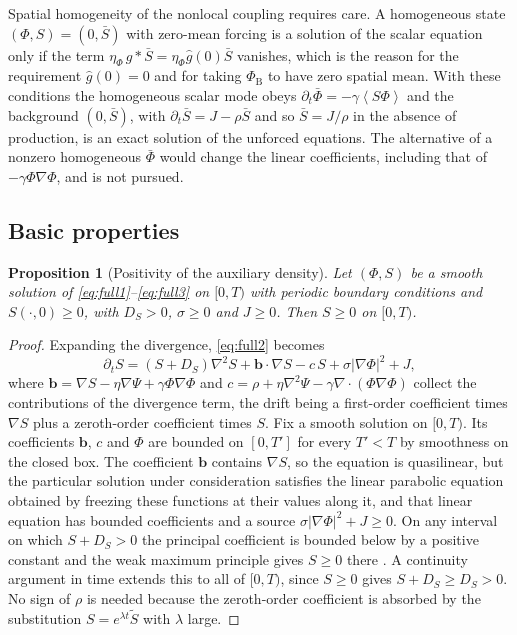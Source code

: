 \documentclass[11pt]{article}
\newtheorem{proposition}{Proposition}[section]
\theoremstyle{definition}
\theoremstyle{remark}
\newcommand{\Phib}{{\Phi_{\mathrm{B}}}}
\newcommand{\Sb}{\bar{S}}
\newcommand{\avg}[1]{\left\langle #1 \right\rangle}
\begin{document}
Spatial homogeneity of the nonlocal coupling requires care. A homogeneous state $(\Phi,S)=(0,\Sb)$ with zero-mean forcing is a solution of the scalar equation only if the term $\eta_\Phi\,g*\Sb=\eta_\Phi\hat g(0)\Sb$ vanishes, which is the reason for the requirement $\hat g(0)=0$ and for taking $\Phib$ to have zero spatial mean. With these conditions the homogeneous scalar mode obeys $\partial_t\bar\Phi=-\gamma\avg{S\Phi}$ and the background $(0,\Sb)$, with $\partial_t\Sb=J-\rho\Sb$ and so $\Sb=J/\rho$ in the absence of production, is an exact solution of the unforced equations. The alternative of a nonzero homogeneous $\bar\Phi$ would change the linear coefficients, including that of $-\gamma\Phi\nabla\Phi$, and is not pursued.

\subsection{Basic properties}

\begin{proposition}[Positivity of the auxiliary density]\label{prop:pos}
Let $(\Phi,S)$ be a smooth solution of \eqref{eq:full1}--\eqref{eq:full3} on $[0,T)$ with periodic boundary conditions and $S(\cdot,0)\ge0$, with $D_S>0$, $\sigma\ge0$ and $J\ge0$. Then $S\ge0$ on $[0,T)$.
\end{proposition}

\begin{proof}
Expanding the divergence, \eqref{eq:full2} becomes
\begin{equation}
\partial_tS=(S+D_S)\nabla^2S+\mathbf b\cdot\nabla S-c\,S+\sigma|\nabla\Phi|^2+J,
\end{equation}
where $\mathbf b=\nabla S-\eta\nabla\Psi+\gamma\Phi\nabla\Phi$ and $c=\rho+\eta\nabla^2\Psi-\gamma\nabla\!\cdot\!(\Phi\nabla\Phi)$ collect the contributions of the divergence term, the drift being a first-order coefficient times $\nabla S$ plus a zeroth-order coefficient times $S$. Fix a smooth solution on $[0,T)$. Its coefficients $\mathbf b$, $c$ and $\Phi$ are bounded on $[0,T']$ for every $T'<T$ by smoothness on the closed box. The coefficient $\mathbf b$ contains $\nabla S$, so the equation is quasilinear, but the particular solution under consideration satisfies the linear parabolic equation obtained by freezing these functions at their values along it, and that linear equation has bounded coefficients and a source $\sigma|\nabla\Phi|^2+J\ge0$. On any interval on which $S+D_S>0$ the principal coefficient is bounded below by a positive constant and the weak maximum principle gives $S\ge0$ there \cite{protter1967}. A continuity argument in time extends this to all of $[0,T)$, since $S\ge0$ gives $S+D_S\ge D_S>0$. No sign of $\rho$ is needed because the zeroth-order coefficient is absorbed by the substitution $S=e^{\lambda t}\tilde S$ with $\lambda$ large.
\end{proof}
\end{document}
